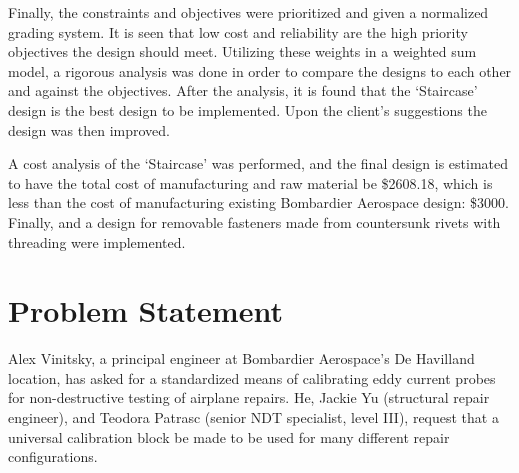 \documentclass[12pt]{article}
\begin{document}
Finally, the constraints and objectives were prioritized and given a normalized grading system. It is seen that low cost and reliability are the high priority objectives the design should meet. Utilizing these weights in a weighted sum model, a rigorous analysis was done in order to compare the designs to each other and against the objectives. After the analysis, it is found that the `Staircase' design is the best design to be implemented. Upon the client's suggestions the design was then improved. 

A cost analysis of the `Staircase' was performed, and the final design is estimated to have the total cost of manufacturing and raw material be \$2608.18, which is less than the cost of manufacturing existing Bombardier Aerospace design: \$3000. Finally, and a design for removable fasteners made from countersunk rivets with threading were implemented. 
\newpage

\renewcommand{\contentsname}{\textsc{Contents}}
\newpage
\textsc{\tableofcontents}
\newpage

\sectionfont{\scshape}


\section{Problem Statement}
Alex Vinitsky, a principal engineer at Bombardier Aerospace's De Havilland location, has asked for a standardized means of calibrating eddy current probes for non-destructive testing of airplane repairs. He, Jackie Yu (structural repair engineer), and Teodora Patrasc (senior NDT specialist, level III), request that a universal calibration block be made to be used for many different repair configurations.
\end{document}
